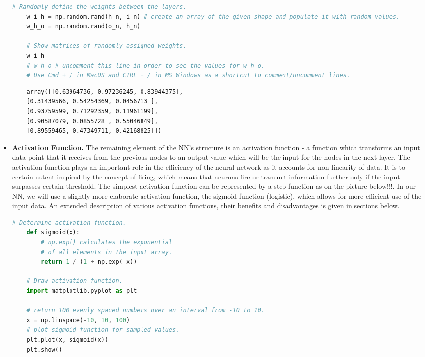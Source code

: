 \begin{itemize}
\begin{lstlisting}[language=Python]
    # Randomly define the weights between the layers. 
    w_i_h = np.random.rand(h_n, i_n) # create an array of the given shape and populate it with random values.
    w_h_o = np.random.rand(o_n, h_n) 
    
    # Show matrices of randomly assigned weights.
    w_i_h
    # w_h_o # uncomment this line in order to see the values for w_h_o.
    # Use Cmd + / in MacOS and CTRL + / in MS Windows as a shortcut to comment/uncomment lines.
\end{lstlisting}

\begin{lstlisting}
    array([[0.63964736, 0.97236245, 0.83944375],
    [0.31439566, 0.54254369, 0.0456713 ],
    [0.93759599, 0.71292359, 0.11961199],
    [0.90587079, 0.0855728 , 0.55046849],
    [0.89559465, 0.47349711, 0.42168825]])
\end{lstlisting}

\item \textbf{Activation Function.} The remaining element of the NN's structure is an activation function - a function which transforms an input data point that it receives from the previous nodes to an output value which will be the input for the nodes in the next layer. The activation function plays an important role in the efficiency of the neural network as it accounts for non-linearity of data. 
It is to certain extent inspired by the concept of firing, which means that neurons fire or transmit information further only if the input surpasses certain threshold. The simplest activation function can be represented by a step function as on the picture below!!!. In our NN, we will use a slightly more elaborate activation function, the sigmoid function (logistic), which allows for more efficient use of the input data. An extended description of various activation functions, their benefits and disadvantages is given in sections below.

\begin{lstlisting}[language=Python]
    # Determine activation function.
    def sigmoid(x):
        # np.exp() calculates the exponential
        # of all elements in the input array.
        return 1 / (1 + np.exp(-x)) 

    # Draw activation function.
    import matplotlib.pyplot as plt
    
    # return 100 evenly spaced numbers over an interval from -10 to 10.
    x = np.linspace(-10, 10, 100) 
    # plot sigmoid function for sampled values.
    plt.plot(x, sigmoid(x)) 
    plt.show()
\end{lstlisting}


\end{itemize}
